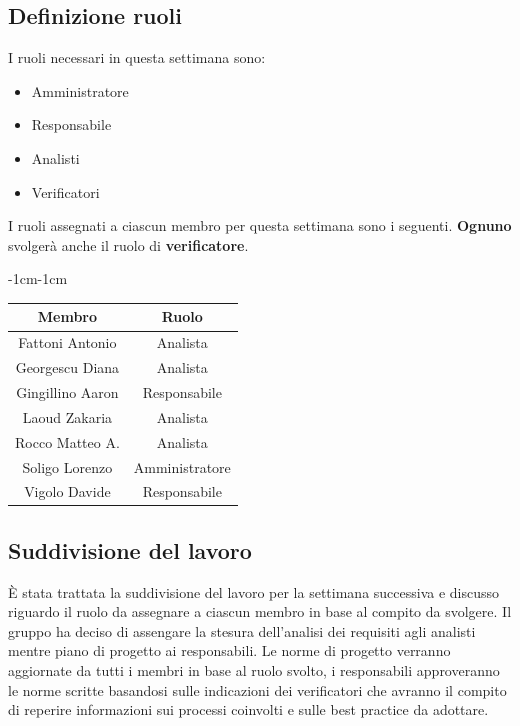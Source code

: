 \documentclass[a4paper,12pt]{article}
\begin{document}
\subsection{Definizione ruoli}
I ruoli necessari in questa settimana sono:
\begin{itemize}[noitemsep]
    \item Amministratore
    \item Responsabile
    \item Analisti
    \item Verificatori
\end{itemize}

\noindent I ruoli assegnati a ciascun membro per questa settimana sono i seguenti. \textbf{Ognuno} svolgerà anche il ruolo di \textbf{verificatore}.
\begin{table}[H]
    \begin{adjustwidth}{-1cm}{-1cm}
    \centering
\begin{tabular}{|c|c|}
    \hline
    \textbf{Membro} & \textbf{Ruolo} \\
    \hline
    Fattoni Antonio & Analista\\
    \hline
    Georgescu Diana & Analista\\
    \hline
    Gingillino Aaron& Responsabile\\
    \hline
    Laoud Zakaria & Analista\\
    \hline
    Rocco Matteo A. & Analista\\
    \hline
    Soligo Lorenzo & Amministratore\\
    \hline
    Vigolo Davide & Responsabile\\
    \hline
\end{tabular}
    \end{adjustwidth}
\end{table}


\subsection{Suddivisione del lavoro}
È stata trattata la suddivisione del lavoro per la settimana successiva e discusso riguardo il ruolo da assegnare a ciascun membro in base al compito da svolgere.
Il gruppo ha deciso di assengare la stesura dell'analisi dei requisiti agli analisti mentre piano di progetto ai responsabili. Le norme di progetto verranno aggiornate da tutti i membri in base al ruolo svolto, i responsabili approveranno le norme scritte basandosi sulle indicazioni dei verificatori che avranno il compito di reperire informazioni sui processi coinvolti e sulle best practice da adottare.
\end{document}
